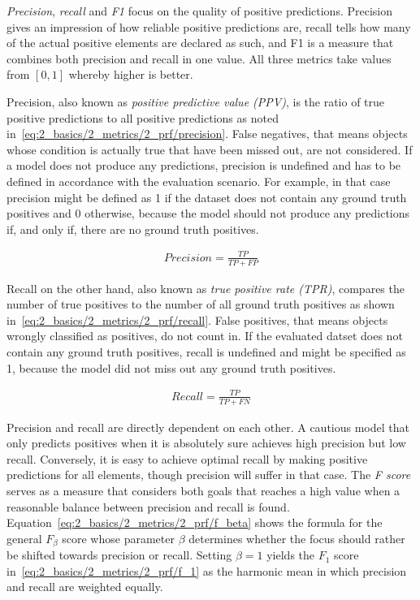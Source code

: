 \emph{Precision}, \emph{recall} and \emph{F1} focus on the quality of positive predictions. Precision gives an impression of how reliable positive predictions are, recall tells how many of the actual positive elements are declared as such, and F1 is a measure that combines both precision and recall in one value. All three metrics take values from $[0, 1]$ whereby higher is better.

Precision, also known as \emph{positive predictive value (PPV)}, is the ratio of true positive predictions to all positive predictions as noted in~\ref{eq:2_basics/2_metrics/2_prf/precision}. False negatives, that means objects whose condition is actually true that have been missed out, are not considered. If a model does not produce any predictions, precision is undefined and has to be defined in accordance with the evaluation scenario. For example, in that case precision might be defined as 1 if the dataset does not contain any ground truth positives and 0 otherwise, because the model should not produce any predictions if, and only if, there are no ground truth positives.

\begin{align}
    Precision = \frac{TP}{TP + FP}
    \label{eq:2_basics/2_metrics/2_prf/precision}
\end{align}

Recall on the other hand, also known as \emph{true positive rate (TPR)}, compares the number of true positives to the number of all ground truth positives as shown in~\ref{eq:2_basics/2_metrics/2_prf/recall}. False positives, that means objects wrongly classified as positives, do not count in. If the evaluated datset does not contain any ground truth positives, recall is undefined and might be specified as 1, because the model did not miss out any ground truth positives.

\begin{align}
    Recall = \frac{TP}{TP + FN}
    \label{eq:2_basics/2_metrics/2_prf/recall}
\end{align}

Precision and recall are directly dependent on each other. A cautious model that only predicts positives when it is absolutely sure achieves high precision but low recall. Conversely, it is easy to achieve optimal recall by making positive predictions for all elements, though precision will suffer in that case. The \emph{F score} serves as a measure that considers both goals that reaches a high value when a reasonable balance between precision and recall is found. Equation~\ref{eq:2_basics/2_metrics/2_prf/f_beta} shows the formula for the general $F_\beta$ score whose parameter $\beta$ determines whether the focus should rather be shifted towards precision or recall. Setting $\beta = 1$ yields the $F_1$ score in~\ref{eq:2_basics/2_metrics/2_prf/f_1} as the harmonic mean in which precision and recall are weighted equally.

